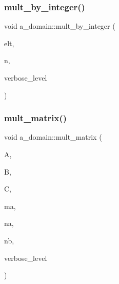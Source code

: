 \subsubsection{\texorpdfstring{mult\+\_\+by\+\_\+integer()}{mult\_by\_integer()}}
{\footnotesize\ttfamily void a\+\_\+domain\+::mult\+\_\+by\+\_\+integer (\begin{DoxyParamCaption}\item[{\mbox{\hyperlink{galois_8h_a09fddde158a3a20bd2dcadb609de11dc}{I\+NT}} $\ast$}]{elt,  }\item[{\mbox{\hyperlink{galois_8h_a09fddde158a3a20bd2dcadb609de11dc}{I\+NT}}}]{n,  }\item[{\mbox{\hyperlink{galois_8h_a09fddde158a3a20bd2dcadb609de11dc}{I\+NT}}}]{verbose\+\_\+level }\end{DoxyParamCaption})}

\mbox{\label{classa__domain_ab04b3597b7c8f411ea790f431dfe9a85}} 
\subsubsection{\texorpdfstring{mult\+\_\+matrix()}{mult\_matrix()}}
{\footnotesize\ttfamily void a\+\_\+domain\+::mult\+\_\+matrix (\begin{DoxyParamCaption}\item[{\mbox{\hyperlink{galois_8h_a09fddde158a3a20bd2dcadb609de11dc}{I\+NT}} $\ast$}]{A,  }\item[{\mbox{\hyperlink{galois_8h_a09fddde158a3a20bd2dcadb609de11dc}{I\+NT}} $\ast$}]{B,  }\item[{\mbox{\hyperlink{galois_8h_a09fddde158a3a20bd2dcadb609de11dc}{I\+NT}} $\ast$}]{C,  }\item[{\mbox{\hyperlink{galois_8h_a09fddde158a3a20bd2dcadb609de11dc}{I\+NT}}}]{ma,  }\item[{\mbox{\hyperlink{galois_8h_a09fddde158a3a20bd2dcadb609de11dc}{I\+NT}}}]{na,  }\item[{\mbox{\hyperlink{galois_8h_a09fddde158a3a20bd2dcadb609de11dc}{I\+NT}}}]{nb,  }\item[{\mbox{\hyperlink{galois_8h_a09fddde158a3a20bd2dcadb609de11dc}{I\+NT}}}]{verbose\+\_\+level }\end{DoxyParamCaption})}

\mbox{\label{classa__domain_a80da652b55ad7d4a7897d412f3720016}} 
